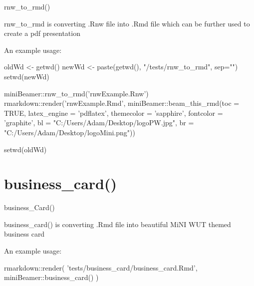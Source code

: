 \documentclass[
  ignorenonframetext,
]{beamer}
\newenvironment{Shaded}{}{}
\newcommand{\DataTypeTok}[1]{#1}
\newcommand{\KeywordTok}[1]{\textcolor[rgb]{0.00,0.00,1.00}{#1}}
\newcommand{\NormalTok}[1]{#1}
\newcommand{\OperatorTok}[1]{#1}
\newcommand{\OtherTok}[1]{\textcolor[rgb]{1.00,0.25,0.00}{#1}}
\newcommand{\StringTok}[1]{\textcolor[rgb]{0.00,0.50,0.50}{#1}}
\begin{document}
\begin{frame}[fragile]{rnw\_to\_rmd()}
\protect\hypertarget{rnw_to_rmd-1}{}

rnw\_to\_rmd is converting .Rnw file into .Rmd file which can be further
used to create a pdf presentation

An example usage:

\scriptsize

\begin{Shaded}
\begin{Highlighting}[]
\NormalTok{oldWd <-}\StringTok{ }\KeywordTok{getwd}\NormalTok{()}
\NormalTok{newWd <-}\StringTok{ }\KeywordTok{paste}\NormalTok{(}\KeywordTok{getwd}\NormalTok{(), }\StringTok{"/tests/rnw_to_rmd"}\NormalTok{, }\DataTypeTok{sep=}\StringTok{""}\NormalTok{)}
\KeywordTok{setwd}\NormalTok{(newWd)}

\NormalTok{miniBeamer}\OperatorTok{::}\KeywordTok{rnw_to_rmd}\NormalTok{(}\StringTok{'rnwExample.Rnw'}\NormalTok{)}
\NormalTok{rmarkdown}\OperatorTok{::}\KeywordTok{render}\NormalTok{(}\StringTok{'rnwExample.Rmd'}\NormalTok{, }
\NormalTok{                  miniBeamer}\OperatorTok{::}\KeywordTok{beam_this_rmd}\NormalTok{(}\DataTypeTok{toc =} \OtherTok{TRUE}\NormalTok{,}
                                            \DataTypeTok{latex_engine =} \StringTok{'pdflatex'}\NormalTok{,}
                                            \DataTypeTok{themecolor =} \StringTok{'sapphire'}\NormalTok{,}
                                            \DataTypeTok{fontcolor =} \StringTok{'graphite'}\NormalTok{,}
                                            \DataTypeTok{bl =} \StringTok{"C:/Users/Adam/Desktop/logoPW.jpg"}\NormalTok{,}
                                            \DataTypeTok{br =} \StringTok{"C:/Users/Adam/Desktop/logoMini.png"}\NormalTok{))}

\KeywordTok{setwd}\NormalTok{(oldWd)}
\end{Highlighting}
\end{Shaded}

\end{frame}

\hypertarget{business_card}{%
\section{business\_card()}\label{business_card}}

\begin{frame}[fragile]{business\_Card()}
\protect\hypertarget{business_card-1}{}

business\_card() is converting .Rmd file into beautiful MiNI WUT themed
business card

An example usage:

\scriptsize

\begin{Shaded}
\begin{Highlighting}[]
\NormalTok{rmarkdown}\OperatorTok{::}\KeywordTok{render}\NormalTok{(}
  \StringTok{'tests/business_card/business_card.Rmd'}\NormalTok{, miniBeamer}\OperatorTok{::}\KeywordTok{business_card}\NormalTok{()}
\NormalTok{)}
\end{Highlighting}
\end{Shaded}

\end{frame}
\end{document}
